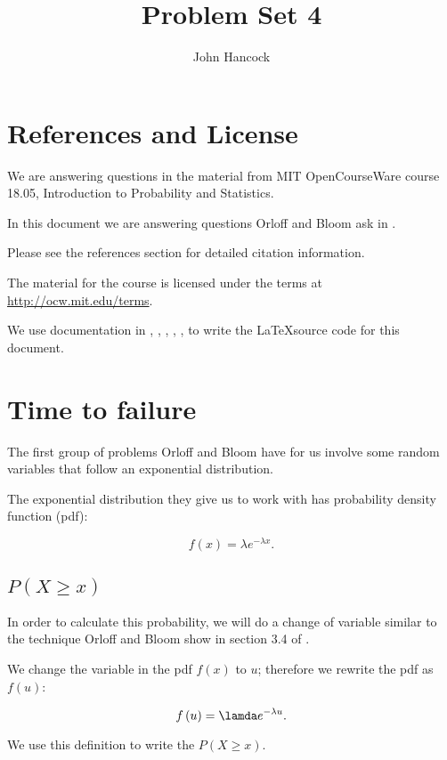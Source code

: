 \documentclass[a4paper,11pt]{article}
\author{John Hancock}
\title{Problem Set 4}
\begin{document}
\maketitle
\tableofcontents
\section{References and License}
We are answering questions in the material from MIT OpenCourseWare
course 18.05, Introduction to Probability and Statistics.

In this document we are answering questions Orloff and Bloom ask in
\cite{slides7}.

Please see the references section for detailed citation information.

The material for the course is licensed under the terms at
\url{http://ocw.mit.edu/terms}.

We use documentation in  \cite{logicNot}, \cite{proofs}, \cite{bars},
\cite{packageClash}, \cite{curlyBrace}, \cite{cases} to write the \LaTeX source code for this document.

\section{Time to failure}
The first group of problems Orloff and Bloom have for us involve some
random variables that follow an exponential distribution.

The exponential distribution they give us to work with has probability
density function (pdf):

\begin{equation}
f\left(x \right) = \lambda e^{-\lambda x}.
\end{equation}


\subsection{$P\left(X \geq x \right)$}

In order to calculate this probability, we will do a change of variable
similar to the technique Orloff and Bloom show in section 3.4 of
\cite{reading7}.

We change the variable in the pdf $f\left(x \right)$ to $u$; therefore we
rewrite the pdf as $f\left( u \right)$:

\begin{equation}
f\left(u \right) = \lamda e^{-\lambda u}.
\end{equation}

We use this definition to write the $P\left(X \geq x \right)$.

\printbibliography{}
\end{document}
